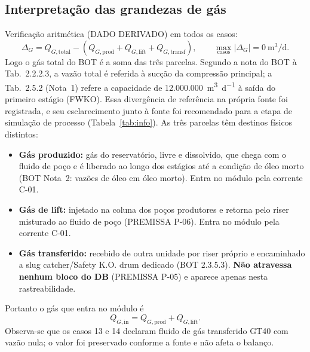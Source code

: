 \documentclass[11pt,a4paper]{article}
\numberwithin{equation}{section}
\numberwithin{table}{section}
\numberwithin{figure}{section}
\newcommand{\tipo}[1]{\textsf{\footnotesize #1}}
\begin{document}
\subsection{Interpretação das grandezas de gás}\label{sec:gas_interp}
Verificação aritmética (\tipo{DADO DERIVADO}) em todos os casos:
\begin{equation}
\Delta_G = Q_{G,\mathrm{total}} - \left(Q_{G,\mathrm{prod}} + Q_{G,\mathrm{lift}} + Q_{G,\mathrm{transf}}\right),\qquad \max_{\text{casos}}|\Delta_G| = 0\ \si{\cubic\metre\per\day}.
\end{equation}
Logo o gás total do BOT é a soma das três parcelas. Segundo a nota do BOT à Tab.~2.2.2.3, a vazão total é referida à sucção da compressão principal; a Tab.~2.5.2 (Nota~1) refere a capacidade de 12.000.000~\si{\cubic\metre\per\day} à saída do primeiro estágio (FWKO). Essa divergência de referência na própria fonte foi registrada, e seu esclarecimento junto à fonte foi recomendado para a etapa de simulação de processo (Tabela~\ref{tab:info}). As três parcelas têm destinos físicos distintos:
\begin{itemize}
\item \textbf{Gás produzido:} gás do reservatório, livre e dissolvido, que chega com o fluido de poço e é liberado ao longo dos estágios até a condição de óleo morto (BOT Nota~2: vazões de óleo em óleo morto). Entra no módulo pela corrente C-01.
\item \textbf{Gás de lift:} injetado na coluna dos poços produtores e retorna pelo riser misturado ao fluido de poço (PREMISSA P-06). Entra no módulo pela corrente C-01.
\item \textbf{Gás transferido:} recebido de outra unidade por riser próprio e encaminhado a slug catcher/Safety K.O. drum dedicado (BOT 2.3.5.3). \textbf{Não atravessa nenhum bloco do DB} (PREMISSA P-05) e aparece apenas nesta rastreabilidade.
\end{itemize}
Portanto o gás que entra no módulo é
\begin{equation}\label{eq:gin}
Q_{G,\mathrm{in}} = Q_{G,\mathrm{prod}} + Q_{G,\mathrm{lift}}.
\end{equation}
Observa-se que os casos 13 e 14 declaram fluido de gás transferido GT40 com vazão nula; o valor foi preservado conforme a fonte e não afeta o balanço.
\end{document}
